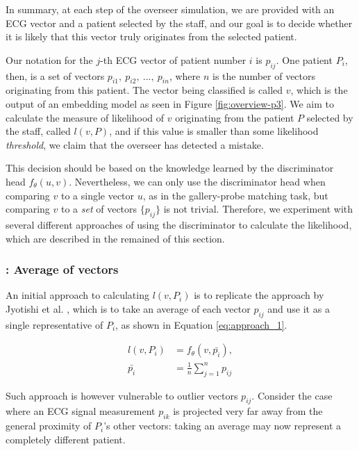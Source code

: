\documentclass[preprint,12pt]{elsarticle}
\begin{document}
In summary, at each step of the overseer simulation, we are provided with an ECG vector and a patient selected by the staff, and our goal is to decide whether it is likely that this vector truly originates from the selected patient.

Our notation for the $j$-th ECG vector of patient number $i$ is $p_{ij}$. One patient $P_i$, then, is a set of vectors $p_{i1},\ p_{i2},\ ...,\ p_{in}$, where $n$ is the number of vectors originating from this patient. The vector being classified is called $v$, which is the output of an embedding model as seen in Figure \ref{fig:overview-p3}. We aim to calculate the measure of likelihood of $v$ originating from the patient $P$ selected by the staff, called $l(v, P)$, and if this value is smaller than some likelihood \textit{threshold}, we claim that the overseer has detected a mistake.

This decision should be based on the knowledge learned by the discriminator head $f_\theta(u, v)$. Nevertheless, we can only use the discriminator head when comparing $v$ to a single vector $u$, as in the gallery-probe matching task, but comparing $v$ to a \textit{set} of vectors $\{p_{ij}\}$ is not trivial. Therefore, we experiment with several different approaches of using the discriminator to calculate the likelihood, which are described in the remained of this section.







\subsubsection{\aA: Average of vectors}
An initial approach to calculating $l(v, P_i)$ is to replicate the approach by Jyotishi et al. \cite{jyotishi2021ecg}, which is to take an average of each vector $p_{ij}$ and use it as a single representative of $P_i$, as shown in Equation \ref{eq:approach_1}.

\begin{equation}
    \begin{aligned}
        \label{eq:approach_1}
        l(v, P_i) & = f_\theta (v, \bar{p_i}), \\ 
        \bar{p_i} & = \frac{1}{n} \sum_{j=1}^n p_{ij}
    \end{aligned}
\end{equation}

Such approach is however vulnerable to outlier vectors $p_{ij}$. Consider the case where an ECG signal measurement $p_{ik}$ is projected very far away from the general proximity of $P_i$'s other vectors: taking an average may now represent a completely different patient.
\end{document}
